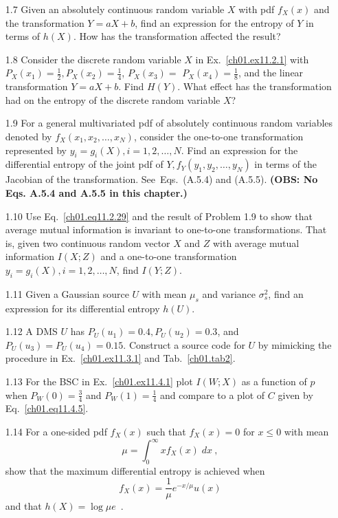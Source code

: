 \begin{itemize}
\item[1.7]
Given an absolutely continuous random variable $X$ with pdf
$f_X(x)$ and the transformation $Y=aX+b$, find an expression for
the entropy of $Y$ in terms of $h(X)$. How has the transformation
affected the result?

\item[1.8]
Consider the discrete random variable $X$ in Ex.~\ref{ch01.ex11.2.1}
with $P_X(x_1)=\tfrac{1}{2}, P_X(x_2)=\tfrac{1}{4}$,
$P_X(x_3)=$ $P_X(x_4)=\tfrac{1}{8}$, and the linear transformation
$Y=aX+b$. Find $H(Y)$. What effect has the transformation had
on the entropy of the discrete random variable $X$?

\item[1.9]
For a general multivariated pdf of absolutely continuous random
variables denoted by $f_X(x_1, x_2, \ldots, x_N)$, consider the
one-to-one transformation represented by $y_i=g_i(X), i=1,2,\ldots,N$.
Find an expression for the differential entropy of the joint pdf of
$Y, f_Y (y_1, y_2, \ldots, y_N)$ in terms of the Jacobian of the
transformation.
See~Eqs.~(A.5.4) and (A.5.5).
\textbf{(OBS: No Eqs. A.5.4 and A.5.5 in this chapter.)}

\item[1.10]
Use Eq.~\eqref{ch01.eq11.2.29} and the result of Problem 1.9
to show that average mutual information is invariant to one-to-one
transformations.
That is, given two continuous random vector $X$ and $Z$ with average
mutual information $I(X; Z)$ and a one-to-one transformation
$y_i = g_i (X), i = 1,2,\ldots,N$, find $I(Y; Z)$.

\item[1.11]
Given a Gaussian source $U$ with mean $\mu_s$ and variance
$\sigma_s^2$, find an expression for its differential entropy $h(U)$.

\item[1.12]
A DMS $U$ has $P_U (u_1)=0.4, P_U(u_2)=0.3$, and
$P_U(u_3) = P_U (u_4) = 0.15$.
Construct a source code for $U$ by mimicking the procedure in
Ex.~\ref{ch01.ex11.3.1} and Tab.~\ref{ch01.tab2}.

\item[1.13]
For the BSC in Ex.~\ref{ch01.ex11.4.1} plot $I(W; X)$ as a function
of $p$ when $P_W (0) = \tfrac{3}{4}$ and $P_W (1)=\tfrac{1}{4}$ and
compare to a plot of $C$ given by Eq.~\eqref{ch01.eq11.4.5}.


\item[1.14]
For a one-sided pdf $f_X(x)$ such that $f_X(x)=0$ for
$x \leq 0$ with mean
$$
        \mu = \int_0^{\infty} x f_X (x) \; dx~,
$$
show that the maximum differential entropy is achieved when
$$
        f_X (x) = \frac{1}{\mu} e^{-x/\mu} u(x)
$$
and that $h(X)=\log \mu e$~.



\end{itemize}
